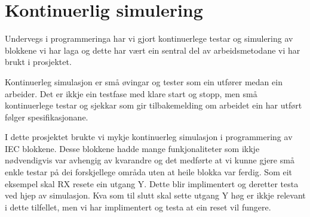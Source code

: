 \section{Kontinuerlig simulering}
\thispagestyle{fancy}

Undervegs i programmeringa har vi gjort kontinuerlege testar og simulering av blokkene vi har laga og
dette har vært ein sentral del av arbeidsmetodane vi har brukt i prosjektet. 

Kontinuerleg simulasjon er små øvingar og tester som ein utfører medan ein arbeider.
Det er ikkje ein testfase med klare start og stopp, men små kontinuerlege testar og sjekkar som gir tilbakemelding
om arbeidet ein har utført følger spesifikasjonane.

I dette prosjektet brukte vi mykje kontinuerleg simulasjon i programmering av IEC blokkene.
Desse blokkene hadde mange funkjonaliteter som ikkje nødvendigvis var avhengig av kvarandre og
det medførte at vi kunne gjere små enkle testar på dei forskjellege områda uten at heile blokka var ferdig. \newline
Som eit eksempel skal RX resete ein utgang Y. Dette blir implimentert og deretter testa ved hjep av simulasjon.
Kva som til slutt skal sette utgang Y høg er ikkje relevant i dette tilfellet, men vi har implimentert 
og testa at ein reset vil fungere.

\newpage